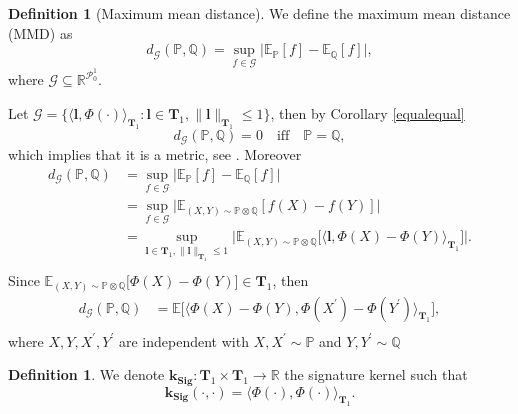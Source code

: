 \documentclass[12pt]{report}
\theoremstyle{definition}
\newtheorem{definition}[theorem]{Definition}
\theoremstyle{remark}
\newcommand{\R}{\mathbb{R}}
\newcommand{\E}{\mathbb{E}}
\renewcommand{\P}{\mathbb{P}}
\begin{document}
\begin{definition}[Maximum mean distance]
  We define the maximum mean distance (MMD) as 
  \begin{equation}
    d_{\mathcal{G}}(\P,\mathbb{Q}) = \sup_{f\in\mathcal{G}}\lvert \E_{\P}[f] - \E_{\mathbb{Q}}[f]\rvert,
  \end{equation}
  where $\mathcal{G} \subseteq \R^{\mathcal{P}_{0}^{1}}$.
\end{definition}
Let $ \mathcal{G} = \{\langle\mathbf{l},\Phi(\cdot)\rangle_{\mathbf{T}_{1}} \colon \mathbf{l} \in \mathbf{T}_{1}, \lVert \mathbf{l}\rVert_{\mathbf{T}_{1}} \leq 1\}$, then by Corollary \ref{equalequal}
\begin{equation}
  d_{\mathcal{G}}(\P,\mathbb{Q}) = 0\quad\text{iff}\quad \P = \mathbb{Q},
\end{equation}
which implies that it is a metric, see \cite{1993Probability}. Moreover 
\begin{equation}
  \begin{split}
    d_{\mathcal{G}}(\P,\mathbb{Q}) &= \sup_{f\in\mathcal{G}}\lvert \E_{\P}[f] - \E_{\mathbb{Q}}[f]\rvert \\
    &= \sup_{f\in\mathcal{G}}\Big\lvert \E_{(X,Y) \sim \P\otimes\mathbb{Q}}[f(X) - f(Y)]\Big\rvert \\  
    &= \sup_{\mathbf{l} \in \mathbf{T}_{1}, \lVert \mathbf{l}\rVert_{\mathbf{T}_{1}} \leq 1}\Big\lvert \E_{(X,Y) \sim \P\otimes\mathbb{Q}}\big[\langle \mathbf{l}, \Phi(X) - \Phi(Y)\rangle_{\mathbf{T}_{1}}\big]\Big\rvert .\\  
  \end{split}
\end{equation}
Since $\E_{(X,Y) \sim \P\otimes\mathbb{Q}}\big[\Phi(X) - \Phi(Y)\big] \in \mathbf{T}_{1}$, then 
\begin{equation}\label{eq348}
  \begin{split}
    d_{\mathcal{G}}(\P,\mathbb{Q}) &= \E\big[\langle \Phi(X) - \Phi(Y), \Phi(X^{\prime}) - \Phi(Y^{\prime})\rangle_{\mathbf{T}_{1}}\big],\\
  \end{split}
\end{equation}
where $X,Y,X^{\prime},Y^{\prime}$ are independent with $X,X^{\prime}\sim\P$ and $Y,Y^{\prime}\sim\mathbb{Q}$
\begin{definition}
  We denote $\mathbf{k_{Sig}}\colon \mathbf{T}_{1}\times\mathbf{T}_{1} \to \R$ the signature kernel such that 
  \begin{equation}
    \mathbf{k_{Sig}}(\cdot,\cdot) = \langle \Phi(\cdot),\Phi(\cdot)\rangle_{\mathbf{T}_{1}}.
  \end{equation}
\end{definition}
\end{document}
